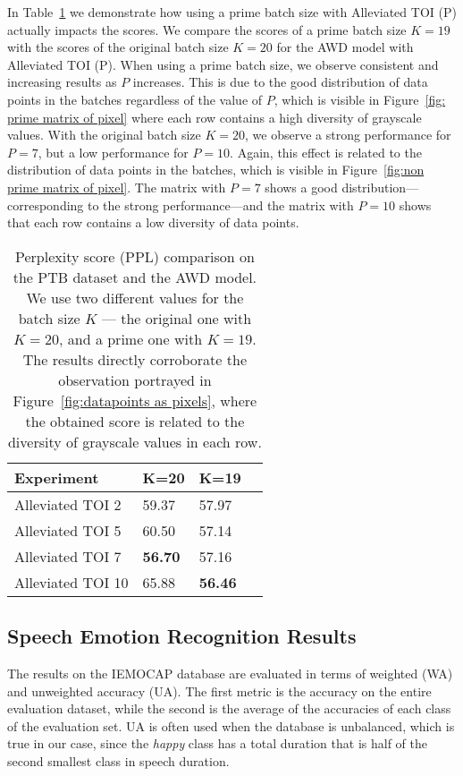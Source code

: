 \documentclass[11pt,a4paper]{article}
\begin{document}
In Table~\ref{table: prime comparison} we demonstrate how using a prime batch size with Alleviated TOI (P) actually impacts the scores. We compare the scores of a prime batch size $K=19$ with the scores of the original batch size $K=20$ for the AWD model with Alleviated TOI (P). When using a prime batch size, we observe consistent and increasing results as $P$ increases. This is due to the good distribution of data points in the batches regardless of the value of $P$, which is visible in Figure~\ref{fig: prime matrix of pixel} where each row contains a high diversity of grayscale values. With the original batch size $K=20$, we observe a strong performance for $P=7$, but a low performance for $P=10$. Again, this effect is related to the distribution of data points in the batches, which is visible in Figure~\ref{fig:non prime matrix of pixel}. The matrix with $P=7$ shows a good distribution---corresponding to the strong performance---and the matrix with $P=10$ shows that each row contains a low diversity of data points.

\begin{table}[t]
\centering
\begin{tabular}{@{}llll@{}}
\toprule
  Experiment & K=20 & K=19\\
  \midrule
  Alleviated TOI 2  & 59.37 & 57.97 \\
  Alleviated TOI 5  & 60.50 & 57.14 \\
  Alleviated TOI 7  & \textbf{56.70} & 57.16 \\
  Alleviated TOI 10 & 65.88 & \textbf{56.46} \\
\bottomrule
\end{tabular}
\caption{
    \label{table: prime comparison}
    Perplexity score (PPL) comparison on the PTB dataset and the AWD model. We use two different values for the batch size $K$ --- the original one with $K=20$, and a prime one with $K=19$. The results directly corroborate the observation portrayed in Figure~\ref{fig:datapoints as pixels}, where the obtained score is related to the diversity of grayscale values in each row.
  }
\end{table}



\subsection{Speech Emotion Recognition Results}

The results on the IEMOCAP database are evaluated in terms of weighted (WA) and unweighted accuracy (UA). The first metric is the accuracy on the entire evaluation dataset, while the second is the average of the accuracies of each class of the evaluation set. UA is often used when the database is unbalanced, which is true in our case, since the \textit{happy} class has a total duration that is half of the second smallest class in speech duration.
\end{document}
